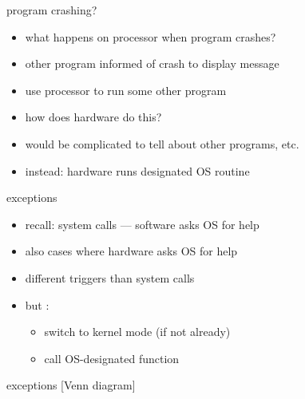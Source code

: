 \usetikzlibrary{shapes.geometric}

\begin{frame}{program crashing?}
\begin{itemize}
\item what happens on processor when program crashes?
\vspace{.5cm}
\item other program informed of crash to display message
\item use processor to run some other program
\vspace{.5cm}
\item<2-> how does hardware do this?
\item<2-> would be complicated to tell about other programs, etc.
\item<2-> instead: hardware runs designated OS routine
\end{itemize}
\end{frame}

\begin{frame}{exceptions}
\begin{itemize}
\item recall: system calls --- software asks OS for help
\vspace{.5cm}
\item also cases where hardware asks OS for help
\item different triggers than system calls
\item but :
    \begin{itemize}
    \item switch to kernel mode (if not already)
    \item call OS-designated function
    \end{itemize}
\end{itemize}
\end{frame}

\begin{frame}{exceptions [Venn diagram]}
\end{frame}
